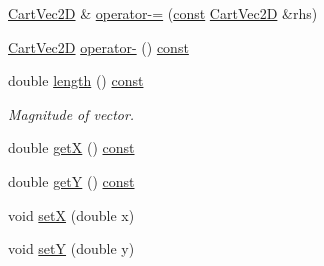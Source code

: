 \begin{DoxyCompactItemize}
\item 
\hyperlink{class_cart_vec2_d}{Cart\+Vec2D} \& \hyperlink{class_cart_vec2_d_a6cc6a41f907b69514a9689bca6d8dd53}{operator-\/=} (\hyperlink{functions__c_8js_afacfd9c985d225bb07483b887a801b6f}{const} \hyperlink{class_cart_vec2_d}{Cart\+Vec2D} \&rhs)
\item 
\hyperlink{class_cart_vec2_d}{Cart\+Vec2D} \hyperlink{class_cart_vec2_d_a5ec1f6b49f1c013302799d95f6c17d33}{operator-\/} () \hyperlink{functions__c_8js_afacfd9c985d225bb07483b887a801b6f}{const} 
\item 
double \hyperlink{class_cart_vec2_d_ac18820336e7e22bf909c9fefff307c9d}{length} () \hyperlink{functions__c_8js_afacfd9c985d225bb07483b887a801b6f}{const} 
\begin{DoxyCompactList}\small\item\em Magnitude of vector. \end{DoxyCompactList}\item 
double \hyperlink{class_cart_vec2_d_aafde5f075265409f2cbcd6f14bf5cbe1}{getX} () \hyperlink{functions__c_8js_afacfd9c985d225bb07483b887a801b6f}{const} 
\item 
double \hyperlink{class_cart_vec2_d_a0ad31fa5e9398132c38e548189ca89a1}{getY} () \hyperlink{functions__c_8js_afacfd9c985d225bb07483b887a801b6f}{const} 
\item 
void \hyperlink{class_cart_vec2_d_ab639eb35be2e12b043fd905a912d367a}{setX} (double x)
\item 
void \hyperlink{class_cart_vec2_d_ad9024978cb20db5e11e8be7d13b51055}{setY} (double y)
\end{DoxyCompactItemize}
